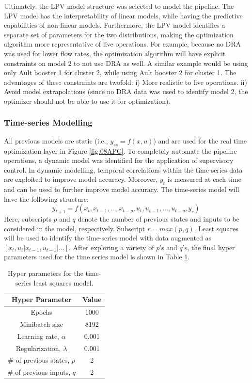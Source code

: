 Ultimately, the LPV model structure was selected to model the pipeline.  The LPV model has the interpretability of linear models, while having the predictive capabilities of non-linear models.  Furthermore, the LPV model identifies a separate set of parameters for the two distributions, making the optimization algorithm more representative of live operations.  For example, because no DRA was used for lower flow rates, the optimization algorithm will have explicit constraints on model 2 to not use DRA as well. A similar example would be using only Ault booster 1 for cluster 2, while using Ault booster 2 for cluster 1.  The advantages of these constraints are twofold: i) More realistic to live operations.  ii) Avoid model extrapolations (since no DRA data was used to identify model 2, the optimizer should not be able to use it for optimization).

\subsubsection{Time-series Modelling}
All previous models are static (i.e., $y_{ss} = f(x, u)$) and are used for the real time optimization layer in Figure \ref{fig:08APC}. To completely automate the pipeline operations, a dynamic model was identified for the application of supervisory control. In dynamic modelling, temporal correlations within the time-series data are exploited to improve model accuracy.  Moreover, $y_t$ is measured at each time and can be used to further improve model accuracy. The time-series model will have the following structure:
\begin{equation}
    y_{t+1} = f(x_{t}, x_{t - 1}, ..., x_{t-p}, u_{t}, u_{t - 1}, ..., u_{t - q}, y_{r})
\end{equation}
Here, subscripts $p$ and $q$ denote the number of previous states and inputs to be considered in the model, respectively.  Subscript $r = max(p, q)$. Least squares will be used to identify the time-series model with data augmented as $[x_t, u_t | x_{t - 1}, u_{t - 1} | ... ]$.  After exploring a variety of $p$'s and $q$'s, the final hyper parameters used for the time series model is shown in Table \ref{tab:08ts_parameters}.
\begin{table}[h]
    \centering
    {
    \begin{tabular}{ c | c}
        Hyper Parameter                  &  Value       \\
        \hline
        Epochs                           &  1000      \\
        Minibatch size                   &  8192     \\
        Learning rate, $\alpha$          &  0.001    \\
        Regularization, $\lambda$        &  0.001    \\
        $\#$ of previous states, $p$     &  2  \\
        $\#$ of previous inputs, $q$     &  2  \\
    \end{tabular}}
    \caption{Hyper parameters for the time-series least squares model.}
    \label{tab:08ts_parameters}
\end{table}

